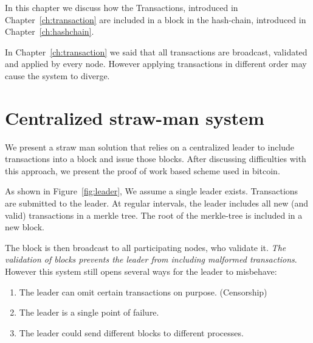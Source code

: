 
In this chapter we discuss how the Transactions, introduced in 
Chapter~\ref{ch:transaction} are included in a block in the hash-chain,
introduced in Chapter~\ref{ch:hashchain}.

In Chapter~\ref{ch:transaction} we said that all transactions are broadcast, validated and applied by every node. However applying transactions in different order may cause the system to diverge.

\section{Centralized straw-man system}
We present a straw man solution that relies on a centralized leader to include transactions into a block and issue those blocks. 
After discussing difficulties with this approach, we present the proof of work based scheme used in bitcoin.

As shown in Figure~\ref{fig:leader}, 
We assume a single leader exists. Transactions are submitted to the leader.
At regular intervals, the leader includes all new (and valid) transactions in a merkle tree. The root of the merkle-tree is included in a new block.

The block is then broadcast to all participating nodes, who validate it.
\emph{The validation of blocks prevents the leader from including malformed transactions}. 
However this system still opens several ways for the leader to misbehave:
\begin{enumerate}[label=\Alph*)]
	\item The leader can omit certain transactions on purpose. (Censorship)
	\item The leader is a single point of failure.
	\item The leader could send different blocks to different processes.
\end{enumerate}



